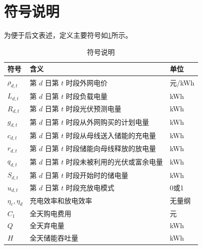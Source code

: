 \documentclass{cumcm2026}
\begin{document}

\section{符号说明}
为便于后文表述，定义主要符号如\cref{tab:q1_symbols}所示。



\begin{table}[H]
  \centering
  \caption{符号说明}
  \label{tab:q1_symbols}
  \begin{tabular}{@{}lll@{}}
    \toprule
    符号 & 含义 & 单位 \\
    \midrule

    $\rho_{d,t}$ & 第 $d$ 日第 $t$ 时段外网电价 & 元/kWh \\
    $L_{d,t}$ & 第 $d$ 日第 $t$ 时段负载电量 & kWh \\
    $R_{d,t}$ & 第 $d$ 日第 $t$ 时段光伏预测电量 & kWh \\
    $g_{d,t}$ & 第 $d$ 日第 $t$ 时段从外网购买的计划电量 & kWh \\
    $c_{d,t}$ & 第 $d$ 日第 $t$ 时段从母线送入储能的充电量 & kWh \\
    $r_{d,t}$ & 第 $d$ 日第 $t$ 时段储能向母线释放的放电量 & kWh \\
    $q_{d,t}$ & 第 $d$ 日第 $t$ 时段未被利用的光伏或富余电量 & kWh \\
    $S_{d,t}$ & 第 $d$ 日第 $t$ 时段开始时的储电量 & kWh \\
    $u_{d,t}$ & 第 $d$ 日第 $t$ 时段充放电模式 & 0或1 \\
    $\eta_c,\eta_d$ & 充电效率和放电效率 & 无量纲 \\
    $C_1$ & 全天购电费用 & 元 \\
    $Q$ & 全天弃电量 & kWh \\
    $H$ & 全天储能吞吐量 & kWh \\
    \bottomrule
  \end{tabular}
\end{table}
\end{document}

